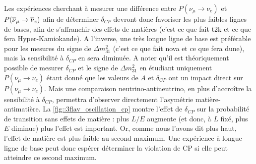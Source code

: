       Les expériences cherchant à mesurer une différence entre $P(\nu_{\mu}\to\nu_e)$ et $P(\overline{\nu}_{\mu}\to\overline{\nu}_e)$ afin de déterminer $\delta_{CP}$ devront donc favoriser les plus faibles lignes de bases, afin de s'affranchir des effets de matières (c'est ce que fait \gls{t2k} et ce que fera Hyper-Kamiokande). A l'inverse, une très longue ligne de base est préférable pour les mesures du signe de $\Delta m^2_{31}$ (c'est ce que fait \gls{nova} et ce que fera \gls{dune}), mais la sensibilité à $\delta_{CP}$ en sera diminuée. A noter qu'il est théoriquement possible de mesurer $\delta_{CP}$ et le signe de $\Delta m^2_{31}$ en étudiant uniquement $P(\nu_{\mu}\to\nu_e)$ étant donné que les valeurs de $A$ et $\delta_{CP}$ ont un impact direct sur $P(\nu_{\mu}\to\nu_e)$. Mais une comparaison neutrino-antineutrino, en plus d'accroître la sensibilité à $\delta_{CP}$, permettra d'observer directement l'asymétrie matière-antimatière. La \autoref{fig::3flav_oscillation_cp} montre l'effet de $\delta_{CP}$ sur la probabilité de transition sans effets de matière : plus $L/E$ augmente (et donc, à $L$ fixé, plus $E$ diminue) plus l'effet est important. Or, comme nous l'avons dit plus haut, l'effet de matière est plus faible au second maximum. Une expérience à longue ligne de base peut donc espérer déterminer la violation de CP si elle peut atteindre ce second maximum.

